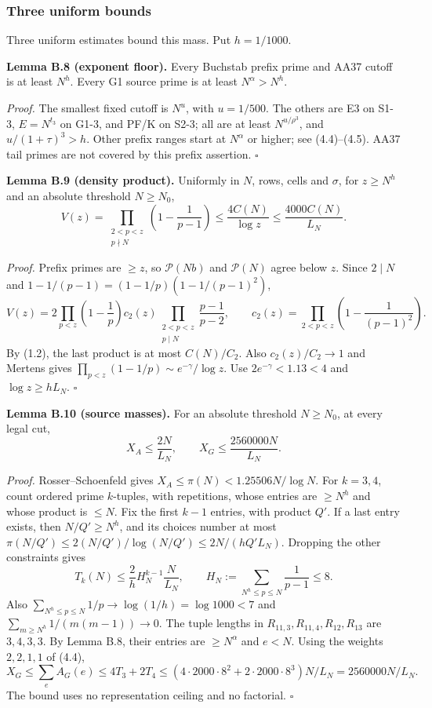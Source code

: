 \subsubsection*{Three uniform bounds}

Three uniform estimates bound this mass. Put $h=1/1000$.

\textbf{Lemma B.8 (exponent floor).} Every Buchstab prefix prime and AA37 cutoff is at least $N^h$.
Every G1 source prime is at least $N^\alpha>N^h$.

\emph{Proof.} The smallest fixed cutoff is $N^u$, with $u=1/500$.
The others are E3 on S1-3, $E=N^{t_3}$ on G1-3,
and PF/K on S2-3; all are at least $N^{u/\rho^3}$, and $u/(1+\tau)^3>h$.
Other prefix ranges start at $N^\alpha$ or higher; see (4.4)--(4.5).
AA37 tail primes are not covered by this prefix assertion. $\square$

\textbf{Lemma B.9 (density product).} Uniformly in $N$, rows, cells and $\sigma$,
for $z\ge N^h$ and an absolute threshold $N\ge N_0$,
\[
 V(z)=\prod_{\substack{2<p<z\\p\nmid N}}\left(1-\frac1{p-1}\right)
 \le\frac{4C(N)}{\log z}\le\frac{4000C(N)}{L_N}.
 \tag{B.9}
\]

\emph{Proof.} Prefix primes are $\ge z$,
so $\mathcal P(Nb)$ and $\mathcal P(N)$ agree below $z$.
Since $2\mid N$ and $1-1/(p-1)=(1-1/p)(1-1/(p-1)^2)$,
\[
 V(z)=2\prod_{p<z}\left(1-\frac1p\right)c_2(z)
 \prod_{\substack{2<p<z\\p\mid N}}\frac{p-1}{p-2},\qquad
 c_2(z)=\prod_{2<p<z}\left(1-\frac1{(p-1)^2}\right).
\]
By (1.2), the last product is at most $C(N)/C_2$.
Also $c_2(z)/C_2\to1$ and Mertens gives
$\prod_{p<z}(1-1/p)\sim e^{-\gamma}/\log z$.
Use $2e^{-\gamma}<1.13<4$ and $\log z\ge hL_N$. $\square$

\textbf{Lemma B.10 (source masses).} For an absolute threshold $N\ge N_0$, at every legal cut,
\[
 X_A\le\frac{2N}{L_N},\qquad X_G\le\frac{2560000N}{L_N}.
 \tag{B.10}
\]

\emph{Proof.} Rosser--Schoenfeld \cite{RosserSchoenfeld1962} gives
$X_A\le\pi(N)<1.25506N/\log N$.
For $k=3,4$, count ordered prime $k$-tuples, with repetitions,
whose entries are $\ge N^h$ and whose product is $\le N$.
Fix the first $k-1$ entries, with product $Q'$.
If a last entry exists, then $N/Q'\ge N^h$,
and its choices number at most
$\pi(N/Q')\le2(N/Q')/\log(N/Q')\le2N/(hQ'L_N)$.
Dropping the other constraints gives
\[
 T_k(N)\le\frac2h H_N^{k-1}\frac N{L_N},\qquad
 H_N:=\sum_{N^h\le p\le N}\frac1{p-1}\le8.
\]
Also $\sum_{N^h\le p\le N}1/p\to\log(1/h)=\log1000<7$
and $\sum_{m\ge N^h}1/(m(m-1))\to0$.
The tuple lengths in $R_{11,3},R_{11,4},R_{12},R_{13}$ are $3,4,3,3$.
By Lemma B.8, their entries are $\ge N^\alpha$ and $e<N$.
Using the weights $2,2,1,1$ of (4.4),
\[
 X_G\le\sum_eA_G(e)\le4T_3+2T_4
 \le(4\cdot2000\cdot8^2+2\cdot2000\cdot8^3)N/L_N
 =2560000N/L_N.
\]
The bound uses no representation ceiling and no factorial. $\square$

